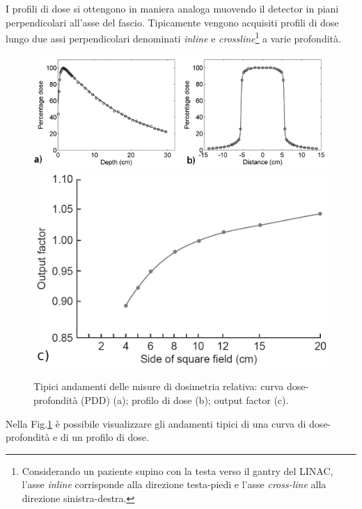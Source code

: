 I profili di dose si ottengono in maniera analoga muovendo il detector in piani perpendicolari all'asse del fascio. Tipicamente vengono acquisiti profili di dose lungo due assi perpendicolari denominati \textit{inline} e \textit{crossline}\footnote{Considerando un paziente supino con la testa verso il gantry del LINAC, l'asse \textit{inline} corrisponde alla direzione testa-piedi e l'asse \textit{cross-line} alla direzione sinistra-destra.} a varie profondità.\\
\begin{figure}[!t]
\centering
\includegraphics[width=\textwidth]{./cap2/pdd_prof.png}\\
\includegraphics[width=.5\textwidth]{./cap2/of.png}
\caption{Tipici andamenti delle misure di dosimetria relativa: curva dose-profondità (PDD) (a); profilo di dose (b); output factor (c).}
\label{fig:pdd_prof}
\end{figure}
Nella Fig.\ref{fig:pdd_prof} è possibile visualizzare gli andamenti tipici di una curva di dose-profondità e di un profilo di dose.


